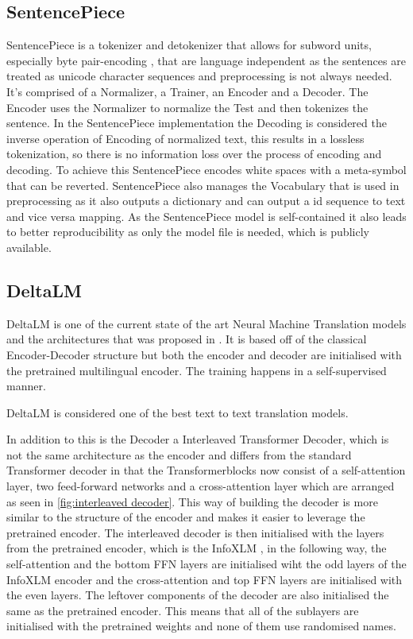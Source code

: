 \subsection{SentencePiece}
SentencePiece \cite{kudo-richardson-2018-sentencepiece} is a tokenizer and detokenizer that allows for subword units, especially byte pair-encoding \cite{sennrich-etal-2016-neural}, that are language independent as the sentences are treated as unicode character sequences and preprocessing is not always needed. 
It's comprised of a Normalizer, a Trainer, an Encoder and a Decoder. 
The Encoder uses the Normalizer to normalize the Test and then tokenizes the sentence. 
In the SentencePiece implementation the Decoding is considered the inverse operation of Encoding of normalized text, this results in a lossless tokenization, so there is no information loss over the process of encoding and decoding. 
To achieve this SentencePiece encodes white spaces with a meta-symbol that can be reverted. 
SentencePiece also manages the Vocabulary that is used in preprocessing as it also outputs a dictionary and can output a id sequence to text and vice versa mapping. 
As the SentencePiece model is self-contained it also leads to better reproducibility as only the model file is needed, which is publicly available. 

\subsection{DeltaLM}
DeltaLM is one of the current state of the art Neural Machine Translation models and the architectures that was proposed in \cite{ma2021deltalm}. 
It is based off of the classical Encoder-Decoder structure but both the encoder and decoder are initialised with the pretrained multilingual encoder. 
The training happens in a self-supervised manner. 

DeltaLM is considered one of the best text to text translation models. 

In addition to this is the Decoder a Interleaved Transformer Decoder, which is not the same architecture as the encoder and differs from the standard Transformer decoder in that the Transformerblocks now consist of a self-attention layer, two feed-forward networks and a cross-attention layer which are arranged as seen in \autoref{fig:interleaved decoder}. 
This way of building the decoder is more similar to the structure of the encoder and makes it easier to leverage the pretrained encoder. 
The interleaved decoder is then initialised with the layers from the pretrained encoder, which is the InfoXLM \cite{chi2021infoxlminformationtheoreticframeworkcrosslingual}, in the following way, the self-attention and the bottom FFN layers are initialised wiht the odd layers of the InfoXLM encoder and the cross-attention and top FFN layers are initialised with the even layers. 
The leftover components of the decoder are also initialised the same as the pretrained encoder. 
This means that all of the sublayers are initialised with the pretrained weights and none of them use randomised names. 

